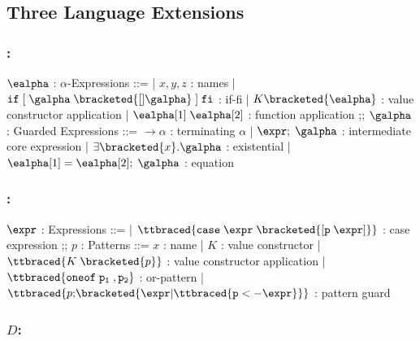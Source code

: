 \documentclass[]{article}
\begin{document}
\subsection{Three Language Extensions}

\subsubsection{\VMinus:}

\begin{center}
    \begin{bnf}
    $\ealpha$ : \textsf{$\alpha$-Expressions} ::=
    | $x, y, z$ : names
    | $\tt{if} \; \tt{[}\; \galpha \; \bracketed{[] \galpha} \;\tt{]} \; \tt{fi}$ : if-fi 
    | $K \bracketed{\ealpha}$ : value constructor application 
    | $\ealpha[1] \; \ealpha[2]$ : function application 
    ;;
    $\galpha$ : \textsf{Guarded Expressions} ::=  
    $\boldsymbol{\rightarrow}\alpha$ : terminating $\alpha$ 
    | $\expr; \; \galpha$ : intermediate core expression 
    | $\exists \bracketed{x} \tt{.} \galpha$ : existential 
    | $\ealpha[1] = \ealpha[2]; \; \galpha$ : equation 
    \end{bnf}
\end{center}

\bigskip 

\subsubsection{\Pplus:}
\begin{center}
    \begin{bnf}
$\expr$ : \textsf{Expressions} ::=
    | $\ttbraced{\tt{case} \; \expr \; \bracketed{\tt{[} p \; \expr \tt{]}}}$ : case expression 
    ;;
    $p$ : \textsf{Patterns} ::= $x$ : name 
    | $K$ : value constructor 
    | $\ttbraced{K \; \bracketed{p}}$ : value constructor application 
    | $\ttbraced{\tt{oneof} \; p_{1} \;, p_{2} }$ : or-pattern 
    | $\ttbraced{p \tt{;} \bracketed{\expr \vert \ttbraced{p  <- \expr}}}$ : pattern guard
    \end{bnf}
\end{center}


\bigskip 

\subsubsection{$D$:}
\end{document}
